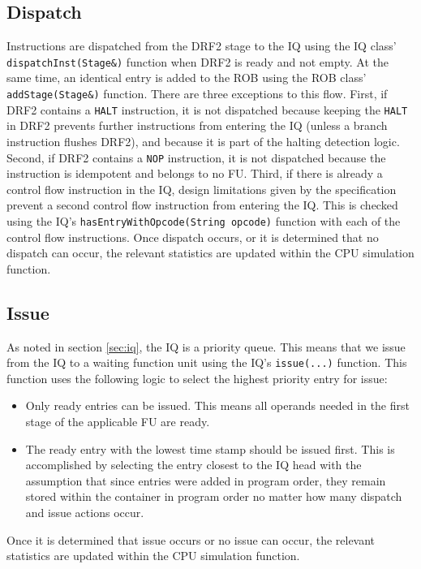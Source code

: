 \documentclass[12pt]{article}
\begin{document}
\subsection{Dispatch}
Instructions are dispatched from the DRF2 stage to the IQ using the IQ class' \texttt{dispatchInst(Stage\&)} function when DRF2 is ready and not empty. 
At the same time, an identical entry is added to the ROB using the ROB class' \texttt{addStage(Stage\&)} function. 
There are three exceptions to this flow.
First, if DRF2 contains a \texttt{HALT} instruction, it is not dispatched because keeping the \texttt{HALT} in DRF2 prevents further instructions from entering the IQ (unless a branch instruction flushes DRF2), and because it is part of the halting detection logic.
Second, if DRF2 contains a \texttt{NOP} instruction, it is not dispatched because the instruction is idempotent and belongs to no FU.
Third, if there is already a control flow instruction in the IQ, design limitations given by the specification prevent a second control flow instruction from entering the IQ.
This is checked using the IQ's \texttt{hasEntryWithOpcode(String opcode)} function with each of the control flow instructions. 
Once dispatch occurs, or it is determined that no dispatch can occur, the relevant statistics are updated within the CPU simulation function.

\subsection{Issue}
As noted in section \ref{sec:iq}, the IQ is a priority queue.
This means that we issue from the IQ to a waiting function unit using the IQ's \texttt{issue(...)} function.
This function uses the following logic to select the highest priority entry for issue:
\begin{itemize}
  \item Only ready entries can be issued. This means all operands needed in the first stage of the applicable FU are ready.
  \item The ready entry with the lowest time stamp should be issued first. This is accomplished by selecting the entry closest to the IQ head with the assumption that since entries were added in program order, they remain stored within the container in program order no matter how many dispatch and issue actions occur.
\end{itemize}
Once it is determined that issue occurs or no issue can occur, the relevant statistics are updated within the CPU simulation function.
\end{document}
